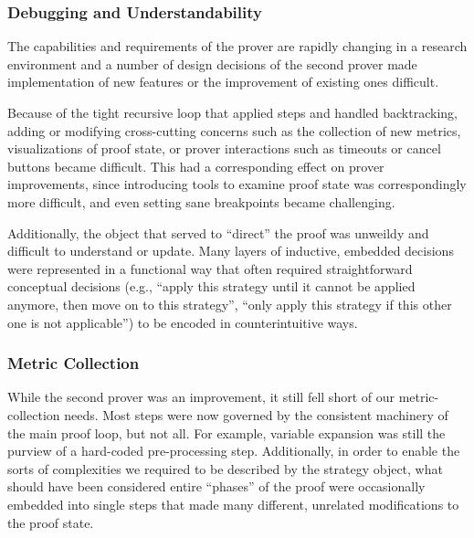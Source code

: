 		\subsubsection{Debugging and Understandability}	

The capabilities and requirements of the prover are rapidly changing in a research environment and a number of design decisions of the second prover made implementation of new features or the improvement of existing ones difficult.

Because of the tight recursive loop that applied steps and handled backtracking, adding or modifying cross-cutting concerns such as the collection of new metrics, visualizations of proof state, or prover interactions such as timeouts or cancel buttons became difficult.  This had a corresponding effect on prover improvements, since introducing tools to examine proof state was correspondingly more difficult, and even setting sane breakpoints became challenging.

Additionally, the object that served to ``direct'' the proof was unweildy and difficult to understand or update.  Many layers of inductive, embedded decisions were represented in a functional way that often required straightforward conceptual decisions (e.g., ``apply this strategy until it cannot be applied anymore, then move on to this strategy'', ``only apply this strategy if this other one is not applicable'') to be encoded in counterintuitive ways.

		\subsubsection{Metric Collection}	

While the second prover was an improvement, it still fell short of our metric-collection needs.  Most steps were now governed by the consistent machinery of the main proof loop, but not all.  For example, variable expansion was still the purview of a hard-coded pre-processing step.  Additionally, in order to enable the sorts of complexities we required to be described by the strategy object, what should have been considered entire ``phases'' of the proof were occasionally embedded into single steps that made many different, unrelated modifications to the proof state.

